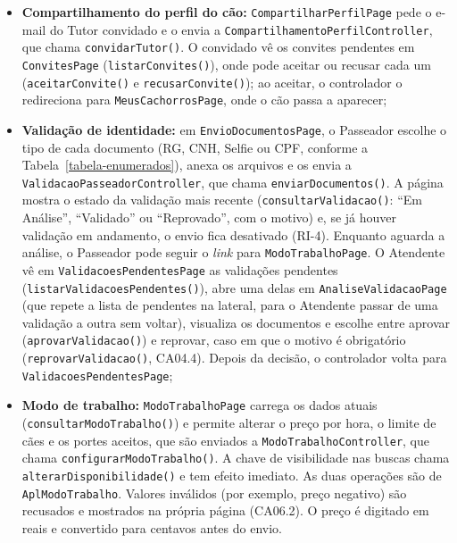 \begin{sloppypar}
\begin{itemize}
	\item \textbf{Compartilhamento do perfil do cão:} \texttt{CompartilharPerfilPage} pede o e-mail do Tutor convidado e o envia a \texttt{CompartilhamentoPerfilController}, que chama \texttt{convidarTutor()}. O convidado vê os convites pendentes em \texttt{ConvitesPage} (\texttt{listarConvites()}), onde pode aceitar ou recusar cada um (\texttt{aceitarConvite()} e \texttt{recusarConvite()}); ao aceitar, o controlador o redireciona para \texttt{MeusCachorrosPage}, onde o cão passa a aparecer;
	\item \textbf{Validação de identidade:} em \texttt{EnvioDocumentosPage}, o Passeador escolhe o tipo de cada documento (RG, CNH, Selfie ou CPF, conforme a Tabela~\ref{tabela-enumerados}), anexa os arquivos e os envia a \texttt{ValidacaoPasseadorController}, que chama \texttt{enviarDocumentos()}. A página mostra o estado da validação mais recente (\texttt{consultarValidacao()}: ``Em Análise'', ``Validado'' ou ``Reprovado'', com o motivo) e, se já houver validação em andamento, o envio fica desativado (RI-4). Enquanto aguarda a análise, o Passeador pode seguir o \textit{link} para \texttt{ModoTrabalhoPage}. O Atendente vê em \texttt{ValidacoesPendentesPage} as validações pendentes (\texttt{listarValidacoesPendentes()}), abre uma delas em \texttt{AnaliseValidacaoPage} (que repete a lista de pendentes na lateral, para o Atendente passar de uma validação a outra sem voltar), visualiza os documentos e escolhe entre aprovar (\texttt{aprovarValidacao()}) e reprovar, caso em que o motivo é obrigatório (\texttt{reprovarValidacao()}, CA04.4). Depois da decisão, o controlador volta para \texttt{ValidacoesPendentesPage};
	\item \textbf{Modo de trabalho:} \texttt{ModoTrabalhoPage} carrega os dados atuais (\texttt{consultarModoTrabalho()}) e permite alterar o preço por hora, o limite de cães e os portes aceitos, que são enviados a \texttt{ModoTrabalhoController}, que chama \texttt{configurarModoTrabalho()}. A chave de visibilidade nas buscas chama \texttt{alterarDisponibilidade()} e tem efeito imediato. As duas operações são de \texttt{AplModoTrabalho}. Valores inválidos (por exemplo, preço negativo) são recusados e mostrados na própria página (CA06.2). O preço é digitado em reais e convertido para centavos antes do envio.
\end{itemize}
\end{sloppypar}


\FloatBarrier

